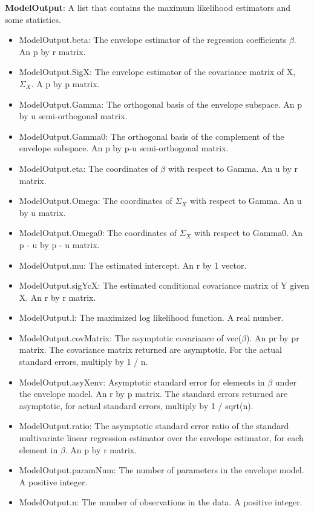 \documentclass[a4paper,11pt,openany]{memoir}
\begin{document}
\begin{par}
\textbf{ModelOutput}: A list that contains the maximum likelihood estimators and some statistics.
\end{par} \vspace{1em}
\begin{itemize}
\setlength{\itemsep}{-1ex}
   \item ModelOutput.beta: The envelope estimator of the regression coefficients $\beta$. An p by r matrix.
   \item ModelOutput.SigX: The envelope estimator of the covariance matrix of X, $\Sigma_X$.  A p by p matrix.
   \item ModelOutput.Gamma: The orthogonal basis of the envelope subspace. An p by u semi-orthogonal matrix.
   \item ModelOutput.Gamma0: The orthogonal basis of the complement of the envelope subspace.  An p by p-u semi-orthogonal matrix.
   \item ModelOutput.eta: The coordinates of $\beta$ with respect to Gamma. An u by r matrix.
   \item ModelOutput.Omega: The coordinates of $\Sigma_X$ with respect to Gamma. An u by u matrix.
   \item ModelOutput.Omega0: The coordinates of $\Sigma_X$ with respect to Gamma0. An p - u by p - u matrix.
   \item ModelOutput.mu: The estimated intercept.  An r by 1 vector.
   \item ModelOutput.sigYcX: The estimated conditional covariance matrix of Y given X. An r by r matrix.
   \item ModelOutput.l: The maximized log likelihood function.  A real number.
   \item ModelOutput.covMatrix: The asymptotic covariance of vec($\beta$).  An pr by pr matrix.  The covariance matrix returned are asymptotic.  For the actual standard errors, multiply by 1 / n.
   \item ModelOutput.asyXenv: Asymptotic standard error for elements in $\beta$ under the envelope model.  An r by p matrix.  The standard errors returned are asymptotic, for actual standard errors, multiply by 1 / sqrt(n).
   \item ModelOutput.ratio: The asymptotic standard error ratio of the standard multivariate linear regression estimator over the envelope estimator, for each element in $\beta$.  An p by r matrix.
   \item ModelOutput.paramNum: The number of parameters in the envelope model.  A positive integer.
   \item ModelOutput.n: The number of observations in the data.  A positive integer.
\end{itemize}
\end{document}
